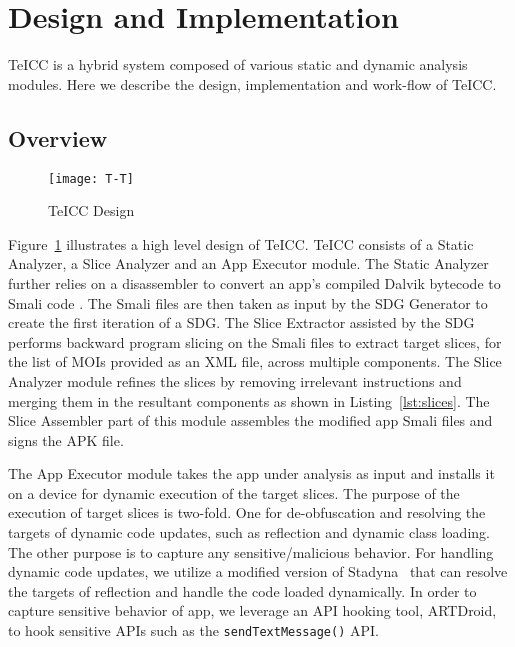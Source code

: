 \section{Design and Implementation}
\label{sec:implementation}

TeICC is a hybrid system composed of various static and dynamic analysis modules. Here we describe the design, implementation and work-flow of TeICC.

\subsection{Overview}


\begin{figure}[h!]
\centering
\texttt{[image: T-T]}%
\caption{TeICC Design}
\label{fig:design}
\end{figure}



Figure~\ref{fig:design} illustrates a high level design of TeICC. TeICC consists of a Static Analyzer, a Slice Analyzer and an App Executor module. The Static Analyzer further relies on a disassembler to convert an app's compiled Dalvik bytecode to Smali code \cite{Smali}. The Smali files are then taken as input by the SDG Generator to create the first iteration of a SDG. The Slice Extractor assisted by the SDG performs backward program slicing on the Smali files to extract target slices, for the list of MOIs provided as an XML file, across multiple components. The Slice Analyzer module refines the slices by removing irrelevant instructions and merging them in the resultant components as shown in Listing~\ref{lst:slices}. The Slice Assembler part of this module assembles the modified app Smali files and signs the APK file. 



The App Executor module takes the app under analysis as input and installs it on a device for dynamic execution of the target slices. The purpose of the execution of target slices is two-fold. One for de-obfuscation and resolving the targets of dynamic code updates, such as reflection and dynamic class loading. The other purpose is to capture any sensitive/malicious behavior. For handling dynamic code updates, we utilize a modified version of Stadyna~\cite{zhauniarovich2015stadyna} that can resolve the targets of reflection and handle the code loaded dynamically. In order to capture sensitive behavior of app, we leverage an API hooking tool, ARTDroid\cite{costamagnaartdroid}, to hook sensitive APIs such as the \texttt{sendTextMessage()} API. 


